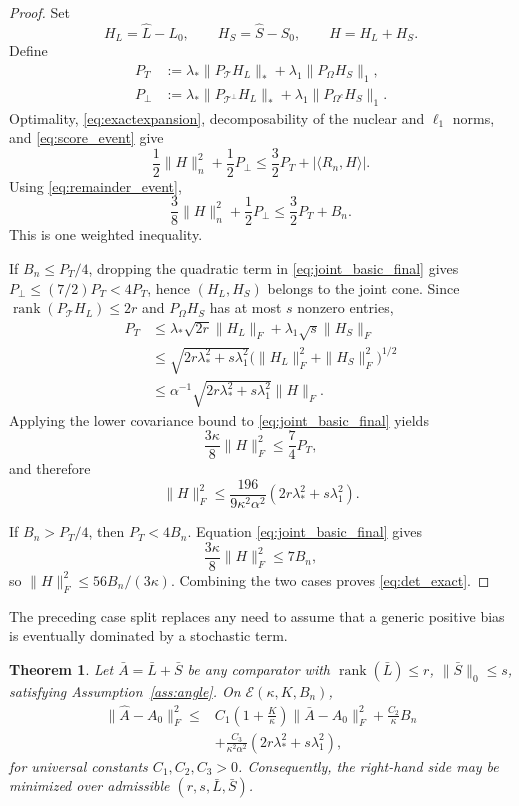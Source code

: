 \documentclass[12pt]{article}
\newtheorem{theorem}{Theorem}
\theoremstyle{definition}
\DeclareMathOperator{\rank}{rank}
\begin{document}
	\begin{proof}
		Set
		\[H_L=\widehat L-L_0,\qquad H_S=\widehat S-S_0,\qquad H=H_L+H_S. \]
		Define
		\begin{align*}
			P_T&:=\lambda_*\|P_\mathcal T H_L\|_*+\lambda_1\|P_\Omega H_S\|_1,\\ P_\perp&:=\lambda_*\|P_{\mathcal T^\perp}H_L\|_*+\lambda_1\|P_{\Omega^c}H_S\|_1.
		\end{align*}
		Optimality, \eqref{eq:exactexpansion}, decomposability of the nuclear and $\ell_1$ norms, and \eqref{eq:score_event} give
		\[\frac12\|H\|_n^2+\frac12P_\perp \le\frac32P_T+|\langle R_n,H\rangle|.\]
		Using \eqref{eq:remainder_event},
		\begin{equation}
			\frac38\|H\|_n^2+\frac12P_\perp \le\frac32P_T+B_n. \label{eq:joint_basic_final}
		\end{equation}
		This is one weighted inequality.
		
		If $B_n\le P_T/4$, dropping the quadratic term in \eqref{eq:joint_basic_final} gives $P_\perp\le(7/2)P_T<4P_T$, hence $(H_L,H_S)$ belongs to the joint cone. Since $\rank(P_\mathcal T H_L)\le2r$ and $P_\Omega H_S$ has at most $s$ nonzero entries,
		\begin{align*}
			P_T&\le\lambda_*\sqrt{2r}\|H_L\|_F+\lambda_1\sqrt{s}\|H_S\|_F\\
			&\le\sqrt{2r\lambda_*^2+s\lambda_1^2} \bigl(\|H_L\|_F^2+\|H_S\|_F^2\bigr)^{1/2}\\
			&\le\alpha^{-1}\sqrt{2r\lambda_*^2+s\lambda_1^2}\|H\|_F.
		\end{align*}
		Applying the lower covariance bound to \eqref{eq:joint_basic_final} yields
		\[\frac{3\kappa}{8}\|H\|_F^2\le\frac74P_T,\]
		and therefore
		\[\|H\|_F^2\le\frac{196}{9\kappa^2\alpha^2} (2r\lambda_*^2+s\lambda_1^2).
		\]
		
		If $B_n>P_T/4$, then $P_T<4B_n$. Equation \eqref{eq:joint_basic_final} gives
		\[\frac{3\kappa}{8}\|H\|_F^2 \le7B_n,\]
		so $\|H\|_F^2\le56B_n/(3\kappa)$. Combining the two cases proves \eqref{eq:det_exact}.
	\end{proof}
	
	The preceding case split replaces any need to assume that a generic positive bias is eventually dominated by a stochastic term.
	
	\begin{theorem}\label{thm:det_oracle}
		Let $\bar A=\bar L+\bar S$ be any comparator with $\rank(\bar L)\le r$, $\|\bar S\|_0\le s$, satisfying Assumption~\ref{ass:angle}. On $\mathcal E(\kappa,K,B_n)$,
		\begin{equation}
			\begin{split}
				\|\widehat A-A_0\|_F^2
				\le{}&
				C_1\left(1+\frac K\kappa\right)\|\bar A-A_0\|_F^2
				+\frac{C_2}{\kappa}B_n\\
				&+\frac{C_3}{\kappa^2\alpha^2}
				\left(2r\lambda_*^2+s\lambda_1^2\right),
			\end{split}
			\label{eq:oracle_approx}
		\end{equation}
		for universal constants $C_1,C_2,C_3>0$. Consequently, the right-hand side may be minimized over admissible $(r,s,\bar L,\bar S)$.
	\end{theorem}
	
\end{document}
